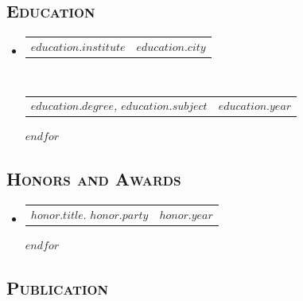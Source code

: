 \documentclass[12pt, letterpaper]{article}
\makeatletter
\newcommand{\headerrow}[2]
{\begin{tabular*}{\linewidth}{l@{\extracolsep{\fill}}r}
	#1 &
	#2 \\
\end{tabular*}}
\makeatother
\begin{document}
\subsection*{\textsc{Education}}
\begin{itemize}
    \parskip=0.1em
    
    $for(education)$
    \item 
    \headerrow
    {\textbf{$education.institute$}}
    {\textbf{$education.city$}}
    \\
    \headerrow
    {\emph{$education.degree$, $education.subject$}}
    {\emph{$education.year$}}
    $endfor$
\end{itemize}

\subsection*{\textsc{Honors and Awards}}
\begin{itemize}
    \parskip=0.1em
    
    $for(honor)$
    \item
    \headerrow
    {\textbf{$honor.title$}. $honor.party$}
    {\emph{$honor.year$}}
    $endfor$
\end{itemize}

\newpage
\subsection*{\textsc{Publication}}
\doublespacing
\nocite{*}
\printbibliography[heading=none]
\end{document}
